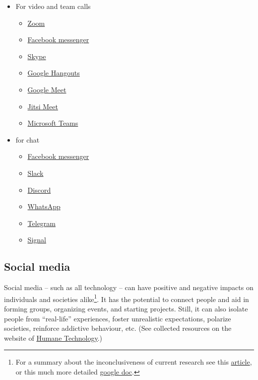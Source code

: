 \documentclass{article}
\begin{document}
\begin{itemize}
    \item For video and team calls
    \begin{itemize}
        \item \href{https://zoom.us/}{Zoom}
        \item \href{https://www.messenger.com/}{Facebook messenger}
        \item \href{https://www.skype.com/en/}{Skype}
        \item \href{https://hangouts.google.com/}{Google Hangouts}
        \item \href{https://meet.google.com/}{Google Meet}
        \item \href{https://jitsi.org/jitsi-meet/}{Jitsi Meet}
        \item \href{https://teams.microsoft.com/}{Microsoft Teams}
    \end{itemize}
    \item for chat
    \begin{itemize}
        \item \href{https://www.messenger.com/}{Facebook messenger}
        \item \href{https://slack.com/}{Slack}
        \item \href{https://discord.com/}{Discord}
        \item \href{https://www.whatsapp.com/}{WhatsApp}
        \item \href{https://telegram.org/}{Telegram}
        \item \href{https://signal.org/en/}{Signal}
    \end{itemize}
\end{itemize}

\subsection{Social media}

Social media – such as all technology – can have positive and negative impacts on individuals and societies alike\footnote{For a summary about the inconclusiveness of current research see this \href{https://www.newyorker.com/culture/annals-of-inquiry/we-know-less-about-social-media-than-we-think}{article}, or this much more detailed \href{https://docs.google.com/document/d/1vVAtMCQnz8WVxtSNQev_e1cGmY9rnY96ecYuAj6C548/edit}{google doc}.}. It has the potential to connect people and aid in forming groups, organizing events, and starting projects. Still, it can also isolate people from ``real-life'' experiences, foster unrealistic expectations, polarize societies, reinforce addictive behaviour, etc. (See collected resources on the website of \href{https://www.humanetech.com/youth}{Humane Technology}.)
\end{document}
